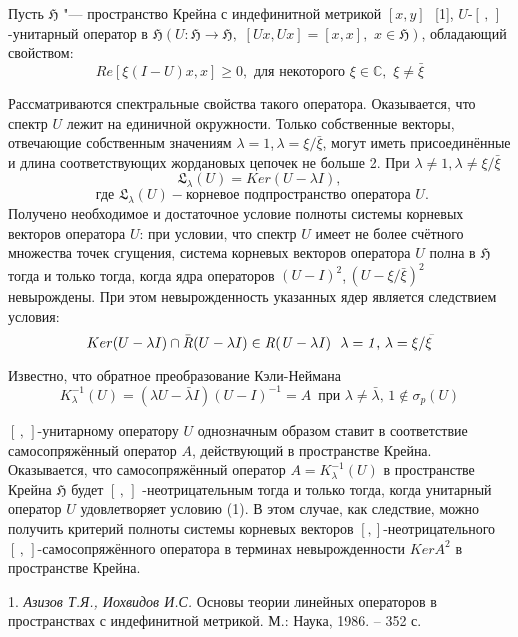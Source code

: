 

\vzmscaption
\sloppy
 Пусть $\mathfrak{H}$ "--- пространство Крейна с индефинитной метрикой $[x, y]$ \,\,[1],  $U$-$[ \,, \,]$-унитарный оператор  в $\mathfrak{H}( U:\mathfrak{H}\rightarrow\mathfrak{H},\,\,[Ux, Ux] = [x, x],\,\,x\in \mathfrak{H})$, обладающий свойством:
 \begin{equation}
Re[\xi(I - U)x, x]\geq 0,\,\,\text{для некоторого}\,\, \xi\in \mathbb{C},\,\,\xi\neq\bar{\xi}
\end{equation}

				Рассматриваются спектральные свойства такого оператора. Оказывается, что спектр  $U$ лежит на единичной окружности. Только собственные векторы, отвечающие собственным значениям $\lambda = 1$,\,$\lambda=\xi/\bar{\xi}$, могут иметь присоединённые и длина соответствующих жордановых цепочек не больше 2. При $\lambda\neq 1, \lambda\neq\xi/\bar{\xi}$
 $$
\mathfrak{L}_{\lambda}(U) = Ker (U-\lambda I),$$$$ \,\, \text{где}\,\,\mathfrak{L}_{\lambda}(U) - \text{корневое подпространство оператора}\,\,U.
$$
 Получено необходимое и достаточное условие полноты системы корневых векторов оператора $U$: при условии, что спектр $U$ имеет не более счётного множества точек сгущения, система корневых векторов оператора $U$  полна в $\mathfrak{H}$ тогда и только тогда, когда ядра операторов $(U - I)^2$,\,$(U - \xi/\bar{\xi})^2$  невырождены. При этом невырожденность указанных ядер является следствием условия:
$$
Ker(U - \lambda I)\cap\bar{\it{R}}(U - \lambda I)\in \it{R}(U - \lambda I)\,\,\,\,\lambda = 1,\,\lambda = \xi/\bar{\xi}
$$

		Известно, что обратное преобразование Кэли-Неймана
$$
K^{-1}_{\lambda}(U) = (\lambda U - \bar{\lambda}I)(U - I)^{-1}  = A\,\,\,\text{при}\,\, \lambda\neq \bar{\lambda}, \, 1\notin\sigma_p(U)
$$

$[ \,, \,]$-унитарному оператору $U$ однозначным образом ставит в соответствие самосопряжённый оператор $A$, действующий в пространстве Крейна.  Оказывается, что самосопряжённый оператор $A = K^{-1}_{\lambda}(U)$  в пространстве Крейна $\mathfrak{H}$ будет $[\, , \,]$ -неотрицательным тогда и только тогда, когда унитарный оператор  $U$ удовлетворяет условию (1). В этом случае, как следствие, можно получить критерий  полноты  системы корневых векторов  $[ , ]$-неотрицательного  $[\, ,\, ]$-самосопряжённого оператора в терминах невырожденности  $Ker A^2$ в
пространстве Крейна.



\litlist

1. {\it Азизов Т.Я., Иохвидов И.С.}
 Основы теории линейных операторов в пространствах с индефинитной метрикой. М.: Наука, 1986. – 352 с.
